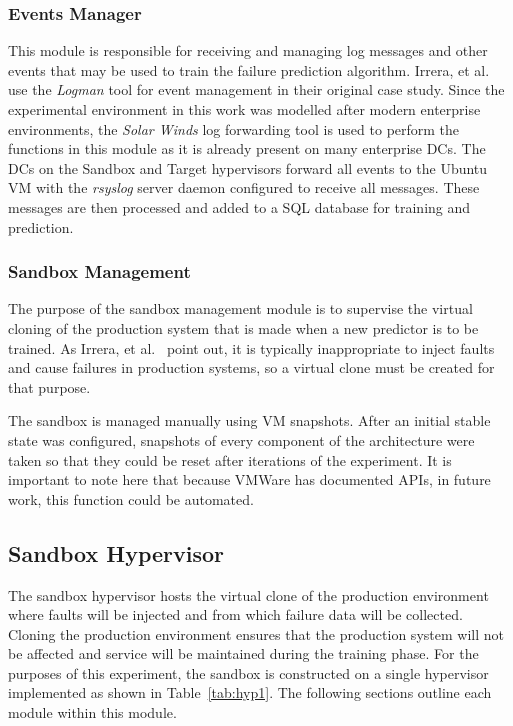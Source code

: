 \subsubsection{Events Manager} \label{sec:eventsManagerMgr}
This module is responsible for receiving and managing log messages and other
events that may be used to train the failure prediction algorithm.  Irrera, et
al.~\cite{irrera2015} use the \emph{Logman} tool for event management in their
original case study.  Since the experimental environment in this work was
modelled after modern enterprise environments, the \emph{Solar Winds} log
forwarding tool is used to perform the functions in this module as it is
already present on many enterprise \ac{DC}s.  The \ac{DC}s on the Sandbox and
Target hypervisors forward all events to the Ubuntu \ac{VM} with the
\emph{rsyslog} server daemon configured to receive all messages.  These
messages are then processed and added to a \ac{SQL} database for training and
prediction.  

\subsubsection{Sandbox Management} \label{sec:sandboxMgr} 
The purpose of the sandbox management module is to supervise the virtual
cloning of the production system that is made when a new predictor is to be
trained.  As Irrera, et al.~\cite{irrera2015,irrera2013} point out, it is
typically inappropriate to inject faults and cause failures in production
systems, so a virtual clone must be created for that purpose.

The sandbox is managed manually using \ac{VM} snapshots.  After an initial
stable state was configured, snapshots of every component of the architecture
were taken so that they could be reset after iterations of the experiment.  It
is important to note here that because VMWare has documented \ac{API}s, in
future work, this function could be automated.

\subsection{Sandbox Hypervisor} \label{sec:sandbox}
The sandbox hypervisor hosts the virtual clone of the production environment
where faults will be injected and from which failure data will be collected.
Cloning the production environment ensures that the production system will not
be affected and service will be maintained during the training phase.  For the
purposes of this experiment, the sandbox is constructed on a single hypervisor
implemented as shown in Table~\ref{tab:hyp1}.  The following sections outline
each module within this module.

